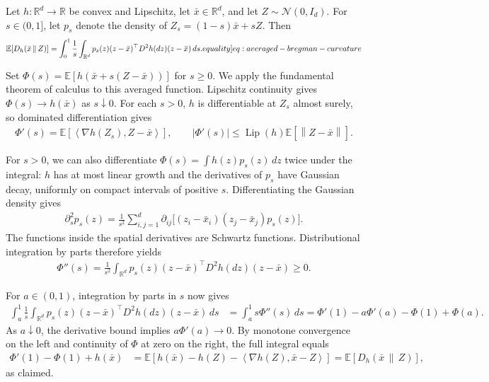 \documentclass[12pt,cleveref]{jmlr}
\renewenvironment{proof}[1][\proofname]
{\par\noindent{\bfseries\upshape #1\ }}
{\jmlrQED}
\newcommand{\eqlabel}[1]{\label[equality]{#1}}
\newcommand{\R}{\mathbb R}
\newcommand{\E}{\mathbb E}
\newcommand{\N}{\mathcal N}
\newcommand{\Lip}{\operatorname{Lip}}
\newcommand{\1}{\mathbf 1}
\newcommand{\ip}[2]{\left\langle #1,#2\right\rangle}
\newcommand{\norm}[1]{\left\lVert #1\right\rVert}
\begin{document}
\begin{lemma}
    \label{lem:averaged-bregman-curvature}
    Let $h:\R^d\to\R$ be convex and Lipschitz, let $\bar{x}\in\R^d$, and let
    $Z\sim\N(0,I_d)$.  For $s\in(0,1]$, let $p_s$ denote the density of $Z_s=(1-s)\bar{x}+sZ$.
    Then
    \begin{align}
        \E[D_h(\bar{x}\,\|\,Z)]
        =
        \int_0^1\frac1s
        \int_{\R^d}
        p_s(z)(z-\bar{x})^\top D^2h(dz)(z-\bar{x})\,ds.
        \eqlabel{eq:averaged-bregman-curvature}
    \end{align}
\end{lemma}
\begin{proof}
    Set $\Phi(s)=\E[h(\bar{x}+s(Z-\bar{x}))]$ for $s\geq0$.
    We apply the fundamental theorem of calculus to this averaged
    function. Lipschitz continuity gives $\Phi(s)\to h(\bar{x})$ as
    $s\downarrow0$. For each $s>0$, $h$ is differentiable at $Z_s$
    almost surely, so dominated differentiation gives
    \begin{align}
        \Phi'(s)=\E[\ip{\nabla h(Z_s)}{Z-\bar{x}}],
        \qquad
        |\Phi'(s)|\leq\Lip(h)\E[\norm{Z-\bar{x}}].
    \end{align}

    For $s>0$, we can also differentiate
    $\Phi(s)=\int h(z)p_s(z)\,dz$ twice under the integral:
    $h$ has at most linear growth and the derivatives of $p_s$ have
    Gaussian decay, uniformly on compact intervals of positive $s$.
    Differentiating the Gaussian density gives
    \begin{align}
        \partial_s^2p_s(z)
        =\frac1{s^2}\sum_{i,j=1}^d
        \partial_{ij}\bigl[(z_i-\bar{x}_i)(z_j-\bar{x}_j)p_s(z)\bigr].
    \end{align}
    The functions inside the spatial derivatives are Schwartz
    functions. Distributional integration by parts therefore yields
    \begin{align}
        \Phi''(s)
        =\frac1{s^2}\int_{\R^d}
        p_s(z)(z-\bar{x})^\top D^2h(dz)(z-\bar{x})
        \geq0.
    \end{align}

    For $a\in(0,1)$, integration by parts in $s$ now gives
    \begin{align}
        \int_a^1\frac1s\int_{\R^d}
        p_s(z)(z-\bar{x})^\top D^2h(dz)(z-\bar{x})\,ds
        & =\int_a^1s\Phi''(s)\,ds
        =\Phi'(1)-a\Phi'(a)-\Phi(1)+\Phi(a).
    \end{align}
    As $a\downarrow0$, the derivative bound implies $a\Phi'(a)\to0$.
    By monotone convergence on the left and continuity of $\Phi$ at
    zero on the right, the full integral equals
    \begin{align}
        \Phi'(1)-\Phi(1)+h(\bar{x})
        & =\E\left[h(\bar{x})-h(Z)
        -\ip{\nabla h(Z)}{\bar{x}-Z}\right]
        =\E[D_h(\bar{x}\,\|\,Z)],
    \end{align}
    as claimed.
\end{proof}
\end{document}
